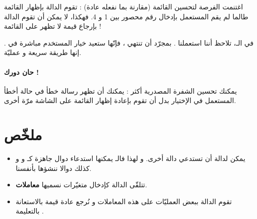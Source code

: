 اغتنمت الفرصة لتحسين القائمة (مقارنة بما نفعله عادة) : تقوم الدالة 
بإظهار القائمة طالما لم يقم المستعمل بإدخال رقم محصور بين 1 و 4. فهكذا، لا يمكن أن تقوم الدالة بإرجاع قيمة لا تظهر على القائمة !

في الـ،
تلاحظ أننا استعملنا 
.
بمجرّد أن تنتهي
،
فإنّها ستعيد خيار المستخدم مباشرة في
.
إنها طريقة سريعة و عمليّة.

\paragraph{حان دورك !}
يمكنك تحسين الشفرة المصدرية أكثر : يمكنك أن تظهر رسالة خطأ في حالة أخطأ المستعمل في الإختيار بدل أن تقوم بإعادة إظهار القائمة على الشاشة مرّة أخرى.

\section*{ملخّص}

\begin{itemize}
	\item يمكن لدالة أن تستدعي دالة أخرى. و لهذا فالـ
	يمكنها استدعاء دوال جاهزة كـ
	و 
	و كذلك دوالا ننشؤها بأنفسنا.
	\item تتلقّى الدالة كإدخال متغيّرات نسميها
	\textbf{معاملات}.
	\item تقوم الدالة ببعض العمليّات على هذه المعاملات و نُرجع عادة قيمة بالاستعانة بالتعليمة
	.
\end{itemize}
